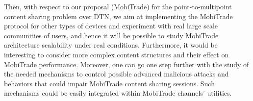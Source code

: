 Then, with respect to our proposal (MobiTrade) for the point-to-multipoint content sharing problem over DTN, we aim at implementing the MobiTrade protocol for other types of devices and experiment with real large scale communities of users, and hence it will be possible to study MobiTrade architecture scalability under real conditions. Furthermore, it would be interesting to consider more complex content structures and their effect on MobiTrade performance. Moreover, one can go one step further with the study of the needed mechanisms to control possible advanced malicious attacks and behaviors that could impair MobiTrade content sharing sessions. Such mechanisms could be easily integrated within MobiTrade channels' utilities.
    



